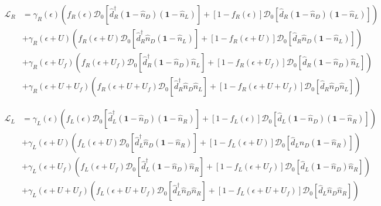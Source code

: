 \begin{align*}
    \mathcal{L}_{R} & = \gamma_{R}(\epsilon)(f_{R}(\epsilon)\mathcal{D}_{0}[\hat{d}^{\dagger}_{R}(\textbf{1}-\hat{n}_{D})(\textbf{1}-\hat{n}_{L}) ]  + [1-f_{R}(\epsilon)]\mathcal{D}_{0}[\hat{d}_{R}(\textbf{1}-\hat{n}_{D})(\textbf{1}-\hat{n}_{L}) ]  )  \\
                    & + \gamma_{R}(\epsilon+U)(f_{R}(\epsilon+U)\mathcal{D}_{0}[\hat{d}^{\dagger}_{R}\hat{n}_{D}(\textbf{1}-\hat{n}_{L}) ]  + [1-f_{R}(\epsilon+U)]\mathcal{D}_{0}[\hat{d}_{R}\hat{n}_{D}(\textbf{1}-\hat{n}_{L}) ]  ) \\
                   & + \gamma_{R}(\epsilon+U_{f})(f_{R}(\epsilon+U_{f})\mathcal{D}_{0}[\hat{d}^{\dagger}_{R}(\textbf{1}-\hat{n}_{D})\hat{n}_{L} ]  + [1-f_{R}(\epsilon+U_{f})]\mathcal{D}_{0}[\hat{d}_{R}(\textbf{1}-\hat{n}_{D})\hat{n}_{L} ]  ) \\
                  & + \gamma_{R}(\epsilon+U+U_{f})(f_{R}(\epsilon+U+U_{f})\mathcal{D}_{0}[\hat{d}^{\dagger}_{R}\hat{n}_{D}\hat{n}_{L} ]  + [1-f_{R}(\epsilon+U+U_{f})]\mathcal{D}_{0}[\hat{d}_{R}\hat{n}_{D}\hat{n}_{L} ]  ) 
\end{align*}

\begin{align*}
    \mathcal{L}_{L} & = \gamma_{L}(\epsilon)(f_{L}(\epsilon)\mathcal{D}_{0}[\hat{d}^{\dagger}_{L}(\textbf{1}-\hat{n}_{D})(\textbf{1}-\hat{n}_{R}) ]  + [1-f_{L}(\epsilon)]\mathcal{D}_{0}[\hat{d}_{L}(\textbf{1}-\hat{n}_{D})(\textbf{1}-\hat{n}_{R}) ]  )  \\
                    & + \gamma_{L}(\epsilon+U)(f_{L}(\epsilon+U)\mathcal{D}_{0}[\hat{d}^{\dagger}_{L}\hat{n}_{D}(\textbf{1}-\hat{n}_{R}) ]  + [1-f_{L}(\epsilon+U)]\mathcal{D}_{0}[\hat{d}_{L}\hat{n}_{D}(\textbf{1}-\hat{n}_{R}) ]  ) \\
                   & + \gamma_{L}(\epsilon+U_{f})(f_{L}(\epsilon+U_{f})\mathcal{D}_{0}[\hat{d}^{\dagger}_{L}(\textbf{1}-\hat{n}_{D})\hat{n}_{R} ]  + [1-f_{L}(\epsilon+U_{f})]\mathcal{D}_{0}[\hat{d}_{L}(\textbf{1}-\hat{n}_{D})\hat{n}_{R} ]  ) \\
                  & + \gamma_{L}(\epsilon+U+U_{f})(f_{L}(\epsilon+U+U_{f})\mathcal{D}_{0}[\hat{d}^{\dagger}_{L}\hat{n}_{D}\hat{n}_{R} ]  + [1-f_{L}(\epsilon+U+U_{f})]\mathcal{D}_{0}[\hat{d}_{L}\hat{n}_{D}\hat{n}_{R} ]  ) 
\end{align*}

